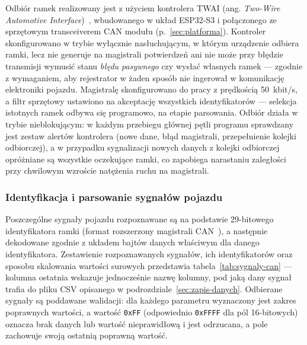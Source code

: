 Odbiór ramek realizowany jest z użyciem kontrolera TWAI (ang. \emph{Two-Wire
Automotive Interface})~\cite{espidf}, wbudowanego w układ ESP32-S3 i połączonego ze
sprzętowym transceiverem CAN modułu (p.~\ref{sec:platforma}). Kontroler
skonfigurowano w trybie wyłącznie nasłuchującym,
w którym urządzenie odbiera ramki, lecz nie generuje na magistrali potwierdzeń
ani nie może przy błędzie transmisji wymusić stanu \emph{błędu pasywnego} czy
wysłać własnych ramek --- zgodnie z wymaganiem, aby rejestrator w żaden sposób
nie ingerował w komunikację elektroniki pojazdu. Magistralę skonfigurowano do
pracy z prędkością 50~kbit/s, a filtr sprzętowy ustawiono na akceptację
wszystkich identyfikatorów --- selekcja
istotnych ramek odbywa się programowo, na etapie parsowania. Odbiór działa
w trybie nieblokującym: w każdym przebiegu głównej pętli programu sprawdzany
jest zestaw alertów kontrolera (nowe dane, błąd magistrali, przepełnienie
kolejki odbiorczej), a w przypadku sygnalizacji nowych danych z kolejki
odbiorczej opróżniane są wszystkie oczekujące ramki, co zapobiega narastaniu
zaległości przy chwilowym wzroście natężenia ruchu na magistrali.

\subsubsection{Identyfikacja i parsowanie sygnałów pojazdu}

Poszczególne sygnały pojazdu rozpoznawane są na podstawie 29-bitowego
identyfikatora ramki (format rozszerzony magistrali CAN~\cite{iso11898}),
a następnie dekodowane zgodnie z układem bajtów danych
właściwym dla danego identyfikatora. Zestawienie rozpoznawanych sygnałów, ich
identyfikatorów oraz sposobu skalowania wartości surowych przedstawia
tabela~\ref{tab:sygnaly-can} --- kolumna ostatnia wskazuje jednocześnie nazwę
kolumny, pod jaką dany sygnał trafia do pliku CSV opisanego
w podrozdziale~\ref{sec:zapis-danych}. Odbierane sygnały są poddawane
walidacji: dla każdego parametru wyznaczony jest zakres poprawnych wartości,
a wartość \texttt{0xFF} (odpowiednio \texttt{0xFFFF} dla pól 16-bitowych)
oznacza brak danych lub wartość nieprawidłową i jest odrzucana, a pole
zachowuje swoją ostatnią poprawną wartość.

